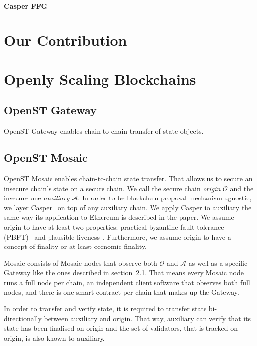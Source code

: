 \documentclass[12pt,a4paper]{article}
\newcommand{\A}{\mathcal{A}}
\newcommand{\OC}{\mathcal{O}}
\begin{document}
\paragraph{Casper FFG}
\cite{casperffg}

%
%
\section{Our Contribution}

%
%
\section{Openly Scaling Blockchains}

\subsection{OpenST Gateway}
\label{subsec:gateway}

OpenST Gateway enables chain-to-chain transfer of state objects.

\subsection{OpenST Mosaic}
\label{subsec:mosaic}
OpenST Mosaic enables chain-to-chain state transfer.
That allows us to secure an insecure chain's state on a secure chain.
We call the secure chain \emph{origin} $\OC$ and the insecure one \emph{auxiliary} $\A$.
In order to be blockchain proposal mechanism agnostic,
we layer Casper~\cite{casperffg} on top of any auxiliary chain.
We apply Casper to auxiliary the same way its application to Ethereum is described in the paper.
We assume origin to have at least two properties:
practical byzantine fault tolerance (PBFT)~\cite{pbft} and plausible liveness~\cite{casperffg}.
Furthermore, we assume origin to have a concept of finality or at least economic finality.

Mosaic consists of Mosaic nodes that observe both $\OC$ and $\A$
as well as a specific Gateway like the ones described in section~\ref{subsec:gateway}.
That means every Mosaic node runs a full node per chain,
an independent client software that observes both full nodes,
and there is one smart contract per chain that makes up the Gateway.

In order to transfer and verify state, it is required to transfer state bi-directionally between auxiliary and origin.
That way, auxiliary can verify that its state has been finalised on origin and
the set of validators, that is tracked on origin, is also known to auxiliary.
\end{document}
